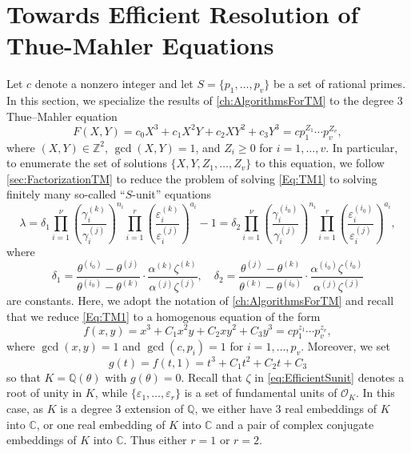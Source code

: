 \documentclass[11pt]{report}
\theoremstyle{definition}
\newcommand{\eps}{\varepsilon}
\begin{document}

\chapter{Towards Efficient Resolution of Thue-Mahler Equations}
\label{ch:EfficientTMSolver}

Let $c$ denote a nonzero integer and let $S=\{p_1,\dotsc,p_v\}$ be a set of rational primes. In this section, we specialize the results of \autoref{ch:AlgorithmsForTM} to the degree $3$ Thue--Mahler equation
\begin{equation} \label{Eq:TM1}
F(X,Y) = c_0 X^3 + c_1 X^{2}Y + c_2XY^2 + c_3Y^3 = c p_1^{Z_1}\cdots p_v^{Z_v},
\end{equation}
where $(X,Y) \in \mathbb{Z}^2$, $\gcd(X,Y)=1$, and $Z_i \geq 0$ for $i = 1, \dots, v$. In particular, to enumerate the set of solutions $\{X,Y, Z_1, \dots, Z_v\}$ to this equation, we follow \autoref{sec:FactorizationTM} to reduce the problem of solving \eqref{Eq:TM1} to solving finitely many so-called ``$S$-unit'' equations
\begin{equation} \label{eq:EfficientSunit}
\lambda = \delta_1 \prod_{i = 1}^{\nu} \left( \frac{\gamma_i^{(k)}}{\gamma_i^{(j)}}\right)^{n_i} \prod_{i = 1}^r\left( \frac{\varepsilon_i^{(k)}}{\varepsilon_i^{(j)}}\right)^{a_i} - 1 = \delta_2 \prod_{i = 1}^{\nu} \left( \frac{\gamma_i^{(i_0)}}{\gamma_i^{(j)}}\right)^{n_i}\prod_{i = 1}^{r}\left( \frac{\varepsilon_i^{(i_0)}}{\varepsilon_i^{(j)}}\right)^{a_i},
\end{equation}
where
\[\delta_1 = \frac{\theta^{(i_0)} - \theta^{(j)}}{\theta^{(i_0)} - \theta^{(k)}}\cdot\frac{\alpha^{(k)}\zeta^{(k)}}{\alpha^{(j)}\zeta^{(j)}}, \quad \delta_2 = \frac{\theta^{(j)} - \theta^{(k)}}{\theta^{(k)} - \theta^{(i_0)}}\cdot \frac{\alpha^{(i_0)}\zeta^{(i_0)}}{\alpha^{(j)}\zeta^{(j)}}\]
are constants. Here, we adopt the notation of \autoref{ch:AlgorithmsForTM} and recall that we reduce \eqref{Eq:TM1} to a homogenous equation of the form
\begin{equation} \label{eq:Efficientpoly}
f(x,y) = x^3 + C_1x^2y + C_2xy^2 + C_3y^3 = cp_1^{z_1}\cdots p_v^{z_v},
\end{equation}
where $\gcd(x,y) = 1$ and $\gcd(c,p_i) = 1$ for $i = 1, \dots, p_v$. Moreover, we set
\begin{equation} \label{eq:Efficientg}
g(t) = f(t,1) = t^3 + C_1t^2 + C_2t + C_3
\end{equation}
so that $K = \mathbb{Q}(\theta)$ with $g(\theta) = 0$. Recall that $\zeta$ in \eqref{eq:EfficientSunit} denotes a root of unity in $K$, while $\{\eps_1, \dots, \eps_r\}$ is a set of fundamental units of $\mathcal{O}_K$. In this case, as $K$ is a degree $3$ extension of $\mathbb{Q}$, we either have $3$ real embeddings of $K$ into $\mathbb{C}$, or one real embedding of $K$ into $\mathbb{C}$ and a pair of complex conjugate embeddings of $K$ into $\mathbb{C}$. Thus either $r = 1$ or $r = 2$.
\end{document}

